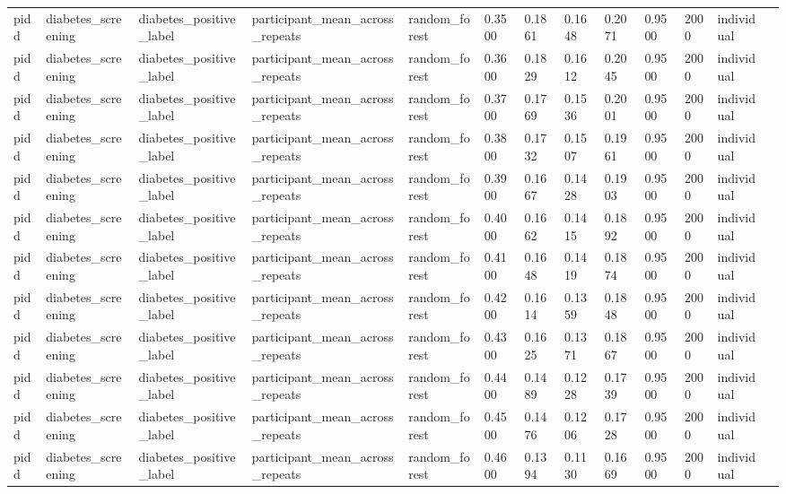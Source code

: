 \begin{tabular}{lllllllllllll}
pidd & diabetes\_screening & diabetes\_positive\_label & participant\_mean\_across\_repeats & random\_forest & 0.3500 & 0.1861 & 0.1648 & 0.2071 & 0.9500 & 2000 & individual &  \\
pidd & diabetes\_screening & diabetes\_positive\_label & participant\_mean\_across\_repeats & random\_forest & 0.3600 & 0.1829 & 0.1612 & 0.2045 & 0.9500 & 2000 & individual &  \\
pidd & diabetes\_screening & diabetes\_positive\_label & participant\_mean\_across\_repeats & random\_forest & 0.3700 & 0.1769 & 0.1536 & 0.2001 & 0.9500 & 2000 & individual &  \\
pidd & diabetes\_screening & diabetes\_positive\_label & participant\_mean\_across\_repeats & random\_forest & 0.3800 & 0.1732 & 0.1507 & 0.1961 & 0.9500 & 2000 & individual &  \\
pidd & diabetes\_screening & diabetes\_positive\_label & participant\_mean\_across\_repeats & random\_forest & 0.3900 & 0.1667 & 0.1428 & 0.1903 & 0.9500 & 2000 & individual &  \\
pidd & diabetes\_screening & diabetes\_positive\_label & participant\_mean\_across\_repeats & random\_forest & 0.4000 & 0.1662 & 0.1415 & 0.1892 & 0.9500 & 2000 & individual &  \\
pidd & diabetes\_screening & diabetes\_positive\_label & participant\_mean\_across\_repeats & random\_forest & 0.4100 & 0.1648 & 0.1419 & 0.1874 & 0.9500 & 2000 & individual &  \\
pidd & diabetes\_screening & diabetes\_positive\_label & participant\_mean\_across\_repeats & random\_forest & 0.4200 & 0.1614 & 0.1359 & 0.1848 & 0.9500 & 2000 & individual &  \\
pidd & diabetes\_screening & diabetes\_positive\_label & participant\_mean\_across\_repeats & random\_forest & 0.4300 & 0.1625 & 0.1371 & 0.1867 & 0.9500 & 2000 & individual &  \\
pidd & diabetes\_screening & diabetes\_positive\_label & participant\_mean\_across\_repeats & random\_forest & 0.4400 & 0.1489 & 0.1228 & 0.1739 & 0.9500 & 2000 & individual &  \\
pidd & diabetes\_screening & diabetes\_positive\_label & participant\_mean\_across\_repeats & random\_forest & 0.4500 & 0.1476 & 0.1206 & 0.1728 & 0.9500 & 2000 & individual &  \\
pidd & diabetes\_screening & diabetes\_positive\_label & participant\_mean\_across\_repeats & random\_forest & 0.4600 & 0.1394 & 0.1130 & 0.1669 & 0.9500 & 2000 & individual &  \\

\end{tabular}
